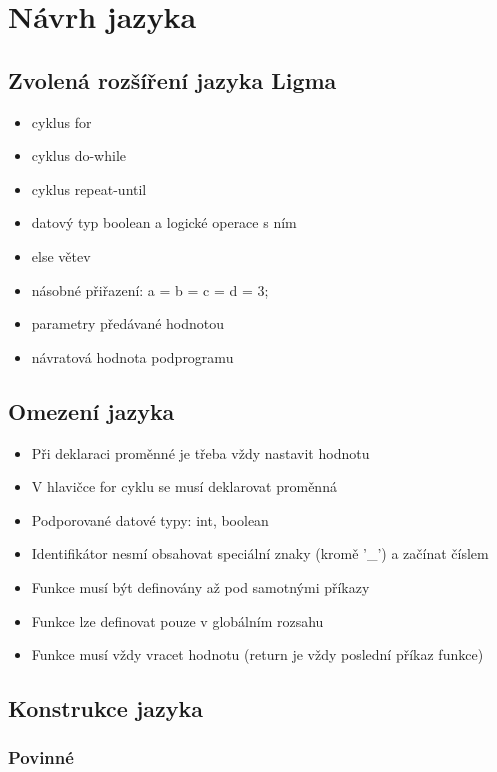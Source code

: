 \documentclass[czech, oth, kiv, he, iso690numb, viewonly]{fasthesis}
\begin{document}
    \chapter{Návrh jazyka}

    \section{Zvolená rozšíření jazyka Ligma}
    \begin{itemize}
        \item cyklus for
        \item cyklus do-while
        \item cyklus repeat-until
        \item datový typ boolean a logické operace s ním
        \item else větev
        \item násobné přiřazení: a = b = c = d = 3;
        \item parametry předávané hodnotou
        \item návratová hodnota podprogramu
    \end{itemize}

    \section{Omezení jazyka}
    \begin{itemize}
        \item Při deklaraci proměnné je třeba vždy nastavit hodnotu
        \item V hlavičce for cyklu se musí deklarovat proměnná
        \item Podporované datové typy: int, boolean
        \item Identifikátor nesmí obsahovat speciální znaky (kromě '\_') a začínat číslem
        \item Funkce musí být definovány až pod samotnými příkazy
        \item Funkce lze definovat pouze v globálním rozsahu
        \item Funkce musí vždy vracet hodnotu (return je vždy poslední příkaz funkce)
    \end{itemize}

    \section{Konstrukce jazyka}

    \subsection{Povinné}
\end{document}
